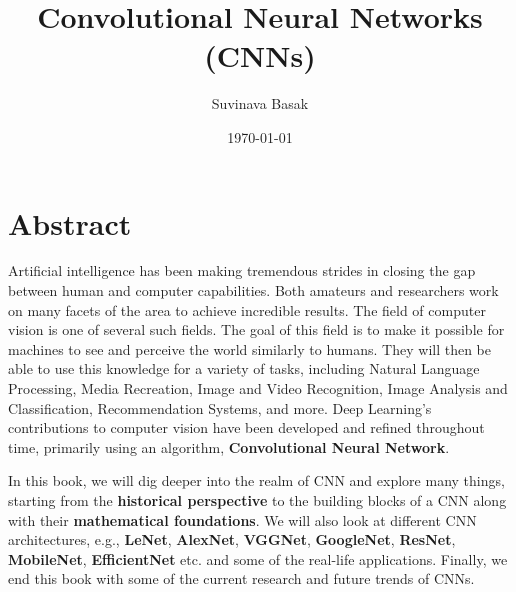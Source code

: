 \documentclass[a4paper,12pt]{book} %
\begin{document}
\pagestyle{fancy}
\fancyhead{} %
\fancyhead[LO,RE]{\small\nouppercase{\rightmark}}
\fancyfoot{} %
\fancyhead[LE,RO]{\small\thepage}
\renewcommand{\headrulewidth}{0pt}

\title{\textbf{Convolutional Neural Networks (CNNs)}}
\author{Suvinava Basak}
\date{\today}
\maketitle

\cleardoublepage

\titleformat{\section}[block]
{\normalfont\Huge\bfseries}{}{0pt}{}

\newpage
\vspace*{5cm} %
\section*{Abstract}
Artificial intelligence has been making tremendous strides in closing the gap between human and computer capabilities. Both amateurs and researchers work on many facets of the area to achieve incredible results. The field of computer vision is one of several such fields.
The goal of this field is to make it possible for machines to see and perceive the world similarly to humans. They will then be able to use this knowledge for a variety of tasks, including Natural Language Processing, Media Recreation, Image and Video Recognition, Image Analysis and Classification, Recommendation Systems, and more. Deep Learning's contributions to computer vision have been developed and refined throughout time, primarily using an algorithm, \textbf{Convolutional Neural Network}.
\newline

\setlength{\parindent}{15pt} %
In this book, we will dig deeper into the realm of CNN and explore many things, starting from the \textbf{historical perspective} to the building blocks of a CNN along with their \textbf{mathematical foundations}. We will also look at different CNN architectures, e.g., \textbf{LeNet}, \textbf{AlexNet}, \textbf{VGGNet}, \textbf{GoogleNet}, \textbf{ResNet}, \textbf{MobileNet}, \textbf{EfficientNet} etc. and some of the real-life applications. Finally, we end this book with some of the current research and future trends of CNNs.
\end{document}
